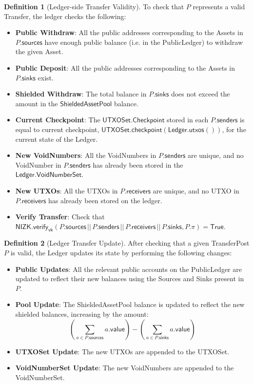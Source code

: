 \documentclass[a4paper]{article}
\theoremstyle{definition}
\newtheorem{definition}{Definition}[subsection]
\newcommand{\Asset}{{\textsf{Asset}}}
\newcommand{\Checkpoint}{{\textsf{Checkpoint}}}
\newcommand{\Ledger}{{\textsf{Ledger}}}
\newcommand{\NIZK}{{\textsf{NIZK}}}
\newcommand{\PublicLedger}{{\textsf{PublicLedger}}}
\newcommand{\ShieldedAssetPool}{{\textsf{ShieldedAssetPool}}}
\newcommand{\Sink}{{\textsf{Sink}}}
\newcommand{\Source}{{\textsf{Source}}}
\newcommand{\TransferPost}{{\textsf{TransferPost}}}
\newcommand{\Transfer}{{\textsf{Transfer}}}
\newcommand{\True}{{\textsf{True}}}
\newcommand{\UTXOSet}{{\textsf{UTXOSet}}}
\newcommand{\UTXO}{{\textsf{UTXO}}}
\newcommand{\VALUE}{{\textsf{value}}}
\newcommand{\VoidNumberSet}{{\textsf{VoidNumberSet}}}
\newcommand{\VoidNumber}{{\textsf{VoidNumber}}}
\newcommand{\checkpoint}{{\textsf{checkpoint}}}
\newcommand{\receivers}{{\textsf{receivers}}}
\newcommand{\senders}{{\textsf{senders}}}
\newcommand{\sinks}{{\textsf{sinks}}}
\newcommand{\sources}{{\textsf{sources}}}
\newcommand{\utxos}{{\textsf{utxos}}}
\newcommand{\verify}{{\textsf{verify}}}
\newcommand{\vk}{{\textsf{vk}}}
\begin{document}
\begin{definition}[\Ledger{}-side \Transfer{} Validity]
    To check that $P$ represents a valid \Transfer{}, the ledger checks the following:
    \begin{itemize}
        \item \textbf{Public Withdraw}: All the public addresses corresponding to the \Asset{s} in $P.\sources$ have enough public balance (i.e. in the \PublicLedger{}) to withdraw the given \Asset{}.
        \item \textbf{Public Deposit}: All the public addresses corresponding to the \Asset{s} in $P.\sinks$ exist.
        \item \textbf{Shielded Withdraw}: The total balance in $P.\sinks$ does not exceed the amount in the $\ShieldedAssetPool{}$ balance.
        \item \textbf{Current \Checkpoint{}}: The $\UTXOSet.\Checkpoint$ stored in each $P.\senders$ is equal to current checkpoint, $\UTXOSet.\checkpoint(\Ledger.\utxos())$, for the current state of the \Ledger{}.
        \item \textbf{New \VoidNumber{s}}: All the \VoidNumber{s} in $P.\senders$ are unique, and no \VoidNumber{} in $P.\senders$ has already been stored in the $\Ledger.\VoidNumberSet$.
        \item \textbf{New \UTXO{s}}: All the \UTXO{s} in $P.\receivers$ are unique, and no \UTXO{} in $P.\receivers$ has already been stored on the ledger.
        \item \textbf{Verify \Transfer{}}: Check that $\NIZK.\verify_\vk(P.\sources \,||\, P.\senders \,||\, P.\receivers \,||\, P.\sinks, P.\pi) = \True$.
    \end{itemize}
\end{definition}

\begin{definition}[\Ledger{} \Transfer{} Update]
    After checking that a given \TransferPost{} $P$ is valid, the \Ledger{} updates its state by performing the following changes:
    \begin{itemize}
        \item \textbf{Public Updates}: All the relevant public accounts on the \PublicLedger{} are updated to reflect their new balances using the \Source{s} and \Sink{s} present in $P$.
        \item \textbf{Pool Update}: The \ShieldedAssetPool{} balance is updated to reflect the new shielded balances, increasing by the amount:
            \[\left(\sum_{a \in P.\sources} a.\VALUE\right) - \left(\sum_{a \in P.\sinks} a.\VALUE\right)\]
        \item \textbf{\UTXOSet{} Update}: The new \UTXO{s} are appended to the \UTXOSet{}.
        \item \textbf{\VoidNumberSet{} Update}: The new \VoidNumber{s} are appended to the \VoidNumberSet{}.
    \end{itemize}
\end{definition}
\end{document}

